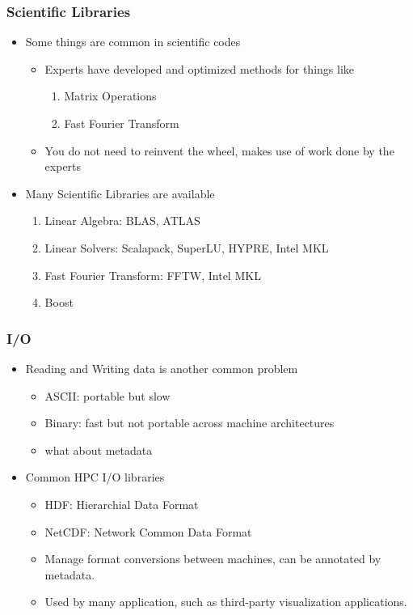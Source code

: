 \documentclass[slidestop,mathserif,compress,xcolor=svgnames,table]{beamer}
\begin{document}
\begin{frame}[c]
  \frametitle{\small Scientific Libraries}
  \begin{itemize}
    \item Some things are common in scientific codes
    \begin{itemize}
      \item Experts have developed and optimized methods for things like
      \begin{enumerate}
        \item Matrix Operations
        \item Fast Fourier Transform
      \end{enumerate}
      \item You do not need to reinvent the wheel, makes use of work done by the experts
    \end{itemize}
    \item Many Scientific Libraries are available
    \begin{enumerate}
      \item Linear Algebra: BLAS, ATLAS
      \item Linear Solvers: Scalapack, SuperLU, HYPRE, Intel MKL
      \item Fast Fourier Transform: FFTW, Intel MKL
      \item Boost
    \end{enumerate}
  \end{itemize}
\end{frame}

\begin{frame}[c]
  \frametitle{\small I/O}
  \begin{itemize}
    \item Reading and Writing data is another common problem
    \begin{itemize}
      \item ASCII: portable but slow
      \item Binary: fast but not portable across machine architectures
      \item what about metadata
    \end{itemize}
    \item Common HPC I/O libraries
    \begin{itemize}
      \item HDF: Hierarchial Data Format
      \item NetCDF: Network Common Data Format
      \item Manage format conversions between machines, can be annotated by metadata.
      \item Used by many application, such as third-party visualization applications.
    \end{itemize}
  \end{itemize}
\end{frame}
\end{document}
